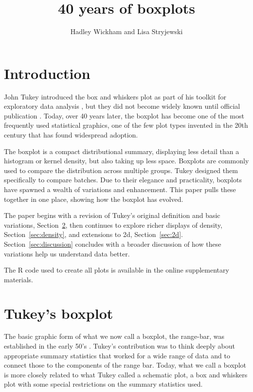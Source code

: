 \documentclass[oneside]{article}
\title{40 years of boxplots}
\author{Hadley Wickham and Lisa Stryjewski}
\begin{document}
\maketitle 

\section{Introduction}

John Tukey introduced the box and whiskers plot as part of his toolkit for  exploratory data analysis \citep{tukey:1970}, but they did not become widely known until official publication \citep{tukey:1977}. Today, over 40 years later, the boxplot has become one of the most frequently used statistical graphics, one of the few plot types invented in the 20th century that has found widespread adoption. 

The boxplot is a compact distributional summary, displaying less detail than a histogram or kernel density, but also taking up less space. Boxplots are commonly used to compare the distribution across multiple groups. Tukey designed them specifically to compare batches. Due to their elegance and practicality, boxplots have spawned a wealth of variations and enhancement. This paper pulls these together in one place, showing how the boxplot has evolved.

The paper begins with a revision of Tukey's original definition and basic variations, Section~\ref{sec:tukey}, then continues to explore richer displays of density, Section~\ref{sec:density}, and extensions to 2d, Section~\ref{sec:2d}. Section~\ref{sec:discussion} concludes with a broader discussion of how these variations help us understand data better.

The R code used to create all plots is available in the online supplementary materials.

\section{Tukey's boxplot}
\label{sec:tukey}

The basic graphic form of what we now call a boxplot, the range-bar, was established in the early 50's \citet[pg. 164]{spear:1952}. Tukey's contribution was to think deeply about appropriate summary statistics that worked for a wide range of data and to connect those to the components of the range bar. Today, what we call a boxplot is more closely related to what Tukey called a schematic plot, a box and whiskers plot with some special restrictions on the summary statistics used. %
\end{document}
